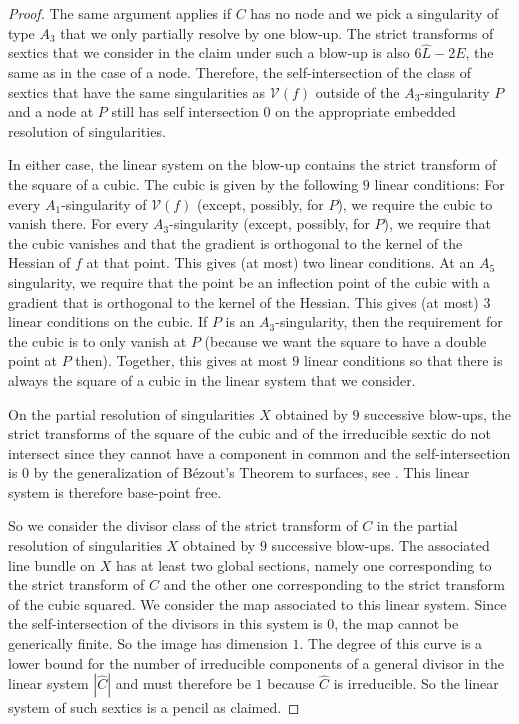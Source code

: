 \documentclass[a4paper]{article}
\numberwithin{equation}{section}
\newcommand{\V}{\mathcal{V}}
\newcommand{\wh}{\widehat}
\theoremstyle{definition}
\theoremstyle{remark}
\begin{document}
\begin{proof}
The same argument applies if $C$ has no node and we pick a singularity of type $A_3$ that we only partially resolve by one blow-up. The strict transforms of sextics that we consider in the claim under such a blow-up is also $6\wh{L} - 2E$, the same as in the case of a node. Therefore, the self-intersection of the class of sextics that have the same singularities as $\V(f)$ outside of the $A_3$-singularity $P$ and a node at $P$ still has self intersection $0$ on the appropriate embedded resolution of singularities.

In either case, the linear system on the blow-up contains the strict transform of the square of a cubic. The cubic is given by the following $9$ linear conditions: For every $A_1$-singularity of $\V(f)$ (except, possibly, for $P$), we require the cubic to vanish there. For every $A_3$-singularity (except, possibly, for $P$), we require that the cubic vanishes and that the gradient is orthogonal to the kernel of the Hessian of $f$ at that point. This gives (at most) two linear conditions. At an $A_5$ singularity, we require that the point be an inflection point of the cubic with a gradient that is orthogonal to the kernel of the Hessian. This gives (at most) $3$ linear conditions on the cubic. If $P$ is an $A_3$-singularity, then the requirement for the cubic is to only vanish at $P$ (because we want the square to have a double point at $P$ then). Together, this gives at most $9$ linear conditions so that there is always the square of a cubic in the linear system that we consider.

On the partial resolution of singularities $X$ obtained by $9$ successive blow-ups, the strict transforms of the square of the cubic and of the irreducible sextic do not intersect since they cannot have a component in common and the self-intersection is $0$ by the generalization of B\'ezout's Theorem to surfaces, see \cite[Prop. V.1.4]{Hartshorne}. This linear system is therefore base-point free.

So we consider the divisor class of the strict transform of $C$ in the partial resolution of singularities $X$ obtained by $9$ successive blow-ups. The associated line bundle on $X$ has at least two global sections, namely one corresponding to the strict transform of $C$ and the other one corresponding to the strict transform of the cubic squared. 
We consider the map associated to this linear system. Since the self-intersection of the divisors in this system is $0$, the map cannot be generically finite. So the image has dimension $1$. The degree of this curve is a lower bound for the number of irreducible components of a general divisor in the linear system $|\wh{C}|$ and must therefore be $1$ because $\wh{C}$ is irreducible. So the linear system of such sextics is a pencil as claimed.
\end{proof}
\end{document}
